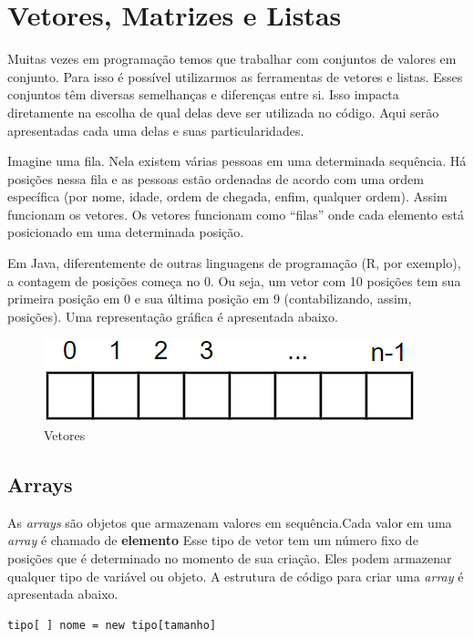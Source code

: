 \documentclass[
]{book}
\begin{document}
\hypertarget{vetores-matrizes-e-listas}{%
\chapter{Vetores, Matrizes e Listas}\label{vetores-matrizes-e-listas}}

Muitas vezes em programação temos que trabalhar com conjuntos de valores em conjunto. Para isso é possível utilizarmos as ferramentas de vetores e listas. Esses conjuntos têm diversas semelhanças e diferenças entre si. Isso impacta diretamente na escolha de qual delas deve ser utilizada no código. Aqui serão apresentadas cada uma delas e suas particularidades.

Imagine uma fila. Nela existem várias pessoas em uma determinada sequência. Há posições nessa fila e as pessoas estão ordenadas de acordo com uma ordem específica (por nome, idade, ordem de chegada, enfim, qualquer ordem). Assim funcionam os vetores. Os vetores funcionam como ``filas'' onde cada elemento está posicionado em uma determinada posição.

Em Java, diferentemente de outras linguagens de programação (R, por exemplo), a contagem de posições começa no 0. Ou seja, um vetor com 10 posições tem sua primeira posição em 0 e sua última posição em 9 (contabilizando, assim, posições). Uma representação gráfica é apresentada abaixo.

\begin{figure}
\centering
\includegraphics{imagens/vetores.png}
\caption{Vetores}
\end{figure}

\hypertarget{arrays}{%
\section{Arrays}\label{arrays}}

As \emph{arrays} são objetos que armazenam valores em sequência.Cada valor em uma \emph{array} é chamado de \textbf{elemento} Esse tipo de vetor tem um número fixo de posições que é determinado no momento de sua criação. Eles podem armazenar qualquer tipo de variável ou objeto. A estrutura de código para criar uma \emph{array} é apresentada abaixo.

\begin{verbatim}
tipo[ ] nome = new tipo[tamanho]
\end{verbatim}
\end{document}
